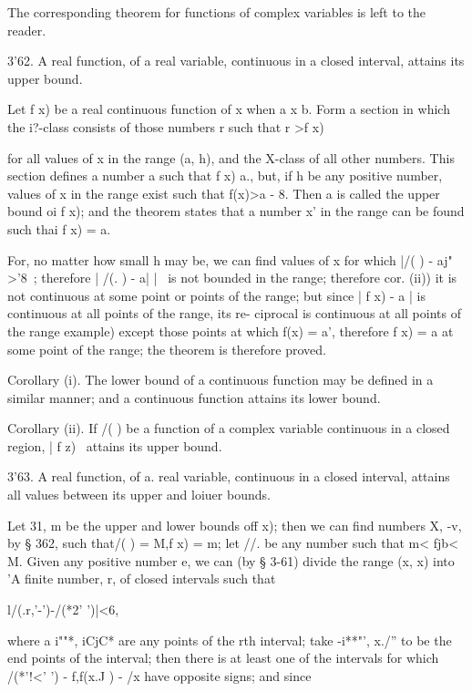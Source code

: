 The corresponding theorem for functions of complex variables is left
to the reader.

3'62. A real function, of a real variable, continuous in a closed
interval, attains its upper bound.

Let f x) be a real continuous function of x when a x b. Form a section
in which the i?-class consists of those numbers r such that r >f x)

%
%

for all values of x in the range (a, h), and the X-class of all other
numbers. This section defines a number a such that f x) a., but, if h
be any positive number, values of x in the range exist such that
f(x)>a - 8. Then a is called the upper bound oi f x); and the theorem
states that a number x' in the range can be found such thai f x) = a.

For, no matter how small h may be, we can find values of x for which
|/( ) - aj" >'8~; therefore | /(. ) - a| |~ is not bounded in the
range; therefore  cor. (ii)) it is not continuous at some point
or points of the range; but since | f x) - a | is continuous at all
points of the range, its re- ciprocal is continuous at all points of
the range  example) except those points at which f(x) = a',
therefore f x) = a at some point of the range; the theorem is
therefore proved.

Corollary (i). The lower bound of a continuous function may be defined
in a similar manner; and a continuous function attains its lower
bound.

Corollary (ii). If /( ) be a function of a complex variable continuous
in a closed region, | f z) \ attains its upper bound.

3'63. A real function, of a. real variable, continuous in a closed
interval, attains all values between its upper and loiuer bounds.

Let 31, m be the upper and lower bounds off x); then we can find
numbers X, -v, by § 362, such that/( ) = M,f x) = m; let //. be any
number such that m< fjb< M. Given any positive number e, we can (by §
3-61) divide the range (x, x) into 'A finite number, r, of closed
intervals such that

l/(.r,'-')-/(*2' ')|<6,

where a i""*, iCjC* are any points of the rth interval; take -i**"',
x./'' to be the end points of the interval; then there is at least
one of the intervals for which /(*'!<' ') - f,f(x.J ) - /x have
opposite signs; and since

